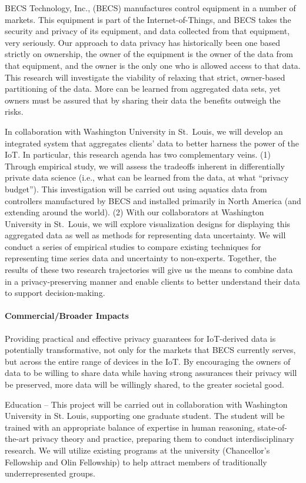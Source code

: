 BECS Technology, Inc., (BECS) manufactures control equipment in a
number of markets.
This equipment is part of the Internet-of-Things, and BECS takes the
security and privacy of its equipment, and data collected from that
equipment, very seriously.
Our approach to data privacy has historically been one based strictly 
on ownership, the owner of the equipment is the owner of the data from
that equipment, and the owner is the only one who is allowed access to
that data.
This research will investigate the viability of relaxing that strict,
owner-based partitioning of the data.  More can be learned from aggregated
data sets, yet owners must be assured that by sharing their data the
benefits outweigh the risks.

In collaboration with Washington University in St.~Louis, we will develop an integrated system that aggregates clients' data to better harness the power of the IoT.  
In particular, this research agenda has two complementary veins. (1) 
Through empirical study,
we will assess the tradeoffs inherent in differentially private 
data science (i.e., what can be learned from the data, at what ``privacy
budget'').
This investigation will be carried out using aquatics data from
controllers manufactured by BECS and installed primarily in North America
(and extending around the world).
(2) With our collaborators at Washington University in St.~Louis, we will explore visualization designs for displaying this aggregated data as well as methods for representing data uncertainty. 
We will conduct a series of empirical studies to compare existing techniques for representing time series data and uncertainty to non-experts. 
Together, the results of these two research trajectories will give us the means to combine data in a privacy-preserving manner and enable clients to better understand their data to support decision-making.  



\medskip

\paragraph{Commercial/Broader Impacts}
Providing practical and effective privacy guarantees for IoT-derived data
is potentially transformative, not only for the markets that BECS currently
serves, but across the entire range of devices in the IoT.
By encouraging the owners of data to be willing to share data while having
strong assurances their privacy will be preserved, more data will be
willingly shared, to the greater societal good.

Education -- This project will be carried out in collaboration with
Washington University in St. Louis, supporting one graduate student.
The student will be trained with an appropriate balance of expertise in human reasoning, state-of-the-art privacy theory and practice, preparing them to conduct interdisciplinary research.
We will utilize existing programs at the university (Chancellor's
Fellowship and Olin Fellowship) to help attract members of traditionally
underrepresented groups.
